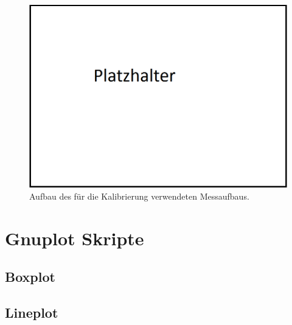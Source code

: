 \begin{appendix}
\begin{figure}[h!]
         \includegraphics[width=\textwidth]{img/00_Placeholder.png}
         \caption[Übersicht Kalibrieraufbau]{Aufbau des für die Kalibrierung verwendeten Messaufbaus.}
         \label{fig:Spider_setup1}
\end{figure}
\newpage
%
\chapter{Gnuplot Skripte}
\section{Boxplot}
\tiny

\label{append_Script_Box-plot}
\newpage
%
\section{Lineplot}
\tiny 
%

\label{append_Script_Line-plot}
\newpage
%

\end{appendix}
